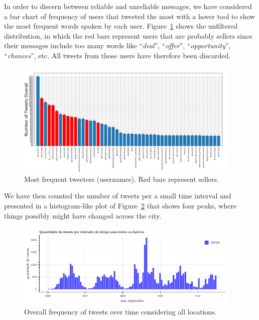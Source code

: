 In order to discern between reliable and unreliable messages, we have considered
a bar chart of frequency of users that tweeted the most with a hover tool to
show the most frequent words spoken by each user.
Figure~\ref{fig:most_freq_users} shows the unfiltered distribution, in which the
red bars represent users that are probably sellers since their messages include
too many words like ``\emph{deal}'', ``\emph{offer}'', ``\emph{opportunity}'',
``\emph{chances}'', etc. All tweets from those users have therefore been
discarded.

\begin{figure}[!h]
    \centering
    \includegraphics[width=0.95\textwidth]{figs/q1/most_freq_users.png}
    \caption{Most frequent tweeters (usernames). Red bars represent sellers.}
    \label{fig:most_freq_users}
\end{figure}

We have then counted the number of tweets per a small time interval and
presented in a histogram-like plot of Figure~\ref{fig:freq_tweet_overall} that 
shows four peaks, where things possibly might have changed across the city.

\begin{figure}[!h]
    \centering
    \includegraphics[width=0.95\textwidth]{figs/q1/freq_tweet_overall.png}
    \caption{Overall frequency of tweets over time considering all locations.}
    \label{fig:freq_tweet_overall}
\end{figure}

